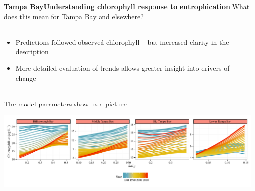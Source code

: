 \documentclass[serif]{beamer}\usepackage[]{graphicx}\usepackage[]{color}
\begin{document}
\begin{frame}{\textbf{Tampa Bay}}{\textbf{Understanding chlorophyll response to eutrophication}}
What does this mean for Tampa Bay and elsewhere?\\~\\
\begin{itemize}
\item Predictions followed observed chlorophyll -- but increased clarity in the description
\item More detailed evaluation of trends allows greater insight into drivers of change\\~\\
\end{itemize}
The model parameters show us a picture...
\centerline{\includegraphics[width = \textwidth]{fig/title_plo.pdf}}
\end{frame}



\end{document}

